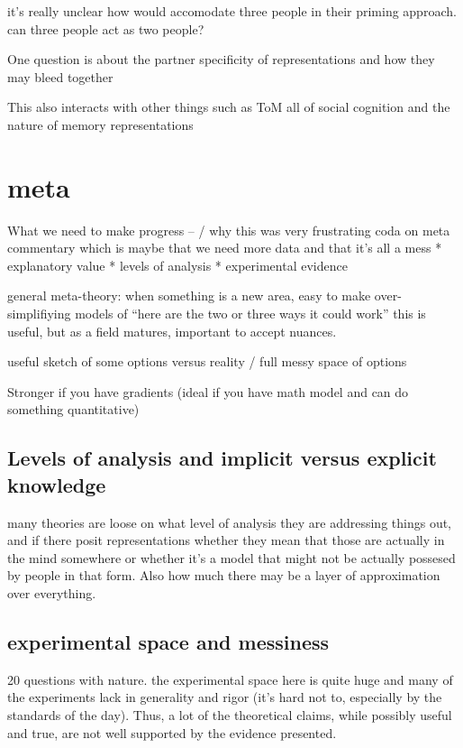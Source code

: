 \documentclass[]{article}
\begin{document}
it's really unclear how \cite{pickering2004} would accomodate three people in their priming approach. can three people act as two people? 


One question is about the partner specificity of representations and how they may bleed together

This also interacts with other things such as ToM all of social cognition and the nature of memory representations 



\section{meta}

What we need to make progress -- / why this was very frustrating 
coda on meta commentary which is maybe that we need more data and that it's all a mess 
* explanatory value
* levels of analysis
* experimental evidence

general meta-theory: when something is a new area, easy to make over-simplifiying models of “here are the two or three ways it could work” this is useful, but as a field matures, important to accept nuances.

useful sketch of some options versus reality / full messy space of options

Stronger if you have gradients (ideal if you have math model and can do something quantitative)

\subsection{ Levels of analysis and implicit versus explicit knowledge}
many theories are loose on what level of analysis they are addressing things out, and if there posit representations whether they mean that those are actually in the mind somewhere or whether it's a model that might not be actually possesed by people in that form. Also how much there may be a layer of approximation over everything. 

\subsection{experimental space and messiness}
20 	questions with nature. 
the experimental space here is quite huge and many of the experiments lack in generality and rigor (it's hard not to, especially by the standards of the day). Thus, a lot of the theoretical claims, while possibly useful and true, are not well supported by the evidence presented. 
\end{document}
